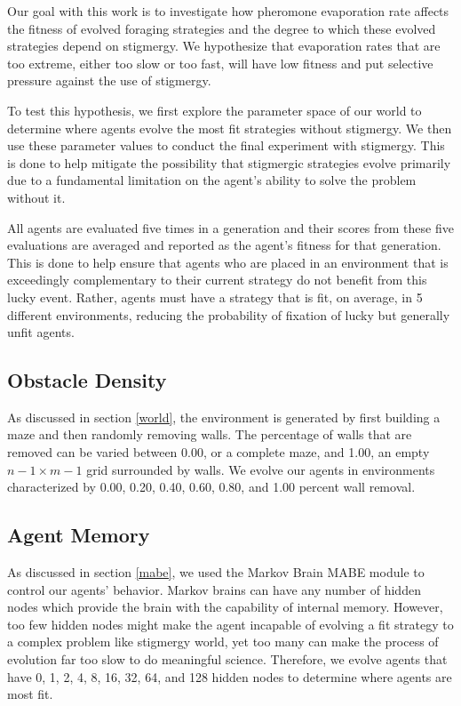 Our goal with this work is to investigate how pheromone evaporation rate affects the fitness of evolved foraging strategies and the degree to which these evolved strategies depend on stigmergy. We hypothesize that evaporation rates that are too extreme, either too slow or too fast, will have low fitness and put selective pressure against the use of stigmergy.

To test this hypothesis, we first explore the parameter space of our world to determine where agents evolve the most fit strategies without stigmergy. We then use these parameter values to conduct the final experiment with stigmergy. This is done to help mitigate the possibility that stigmergic strategies evolve primarily due to a fundamental limitation on the agent's ability to solve the problem without it.

All agents are evaluated five times in a generation and their scores from these five evaluations are averaged and reported as the agent's fitness for that generation. This is done to help ensure that agents who are placed in an environment that is exceedingly complementary to their current strategy do not benefit from this lucky event. Rather, agents must have a strategy that is fit, on average, in 5 different environments, reducing the probability of fixation of lucky but generally unfit agents.

\subsection*{Obstacle Density}

As discussed in section \ref{world}, the environment is generated by first building a maze and then randomly removing walls. The percentage of walls that are removed can be varied between 0.00, or a complete maze, and 1.00, an empty $n-1 \times m-1$ grid surrounded by walls. We evolve our agents in environments characterized by 0.00, 0.20, 0.40, 0.60, 0.80, and 1.00 percent wall removal.

\subsection*{Agent Memory}

As discussed in section \ref{mabe}, we used the Markov Brain MABE module to control our agents’ behavior. Markov brains can have any number of hidden nodes which provide the brain with the capability of internal memory. However, too few hidden nodes might make the agent incapable of evolving a fit strategy to a complex problem like stigmergy world, yet too many can make the process of evolution far too slow to do meaningful science. Therefore, we evolve agents that have 0, 1, 2, 4, 8, 16, 32, 64, and 128 hidden nodes to determine where agents are most fit.

